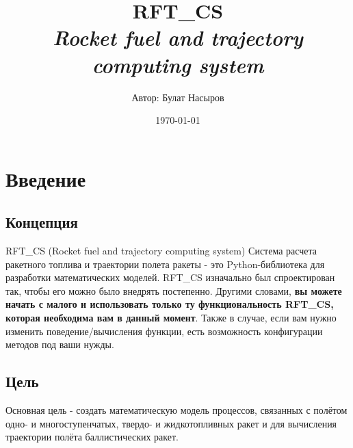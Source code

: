 \documentclass[a4paper, 12pt]{report}
\author{Автор: Булат Насыров}
\title{RFT\_CS \\ \footnotesize{\textit{Rocket fuel and trajectory computing system}}}
\date{\today}
\begin{document}
\maketitle

\tableofcontents{}
\clearpage

\chapter{Введение}

\section{Концепция}
\textrm{
    RFT\_CS (Rocket fuel and trajectory computing system) Система расчета ракетного топлива и траектории полета ракеты - это Python-библиотека для разработки математических моделей. RFT\_CS изначально был спроектирован так, чтобы его можно было внедрять постепенно. Другими словами, \textbf{вы можете начать с малого и использовать только ту функциональность RFT\_CS, которая необходима вам в данный момент}. Также в случае, если вам нужно изменить поведение/вычисления функции, есть возможность конфигурации методов под ваши нужды.
}
\section{Цель}
\textrm{
    Основная цель - создать математическую модель процессов, связанных с полётом одно- и многоступенчатых, твердо- и жидкотопливных ракет и для вычисления траектории полёта баллистических ракет.
}
\clearpage
\end{document}
